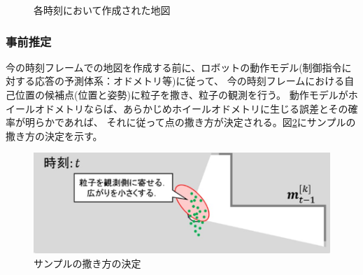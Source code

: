 \begin{figure}[h]
  \begin{center}
  \caption{各時刻において作成された地図}
  \label{slam:zentei}
  \end{center}
\end{figure}

\subsubsection{事前推定}
今の時刻フレームでの地図を作成する前に、ロボットの動作モデル(制御指令に対する応答の予測体系：オドメトリ等)に従って、
今の時刻フレームにおける自己位置の候補点(位置と姿勢)に粒子を撒き、粒子の観測を行う。
動作モデルがホイールオドメトリならば、あらかじめホイールオドメトリに生じる誤差とその確率が明らかであれば、
それに従って点の撒き方が決定される。図\ref{slam:sample}にサンプルの撒き方の決定を示す。

\begin{figure}[h]
  \begin{center}
  \includegraphics[width=.8\linewidth]{img/slam_13.jpg}
  \caption{サンプルの撒き方の決定}
  \label{slam:sample}
  \end{center}
\end{figure}

